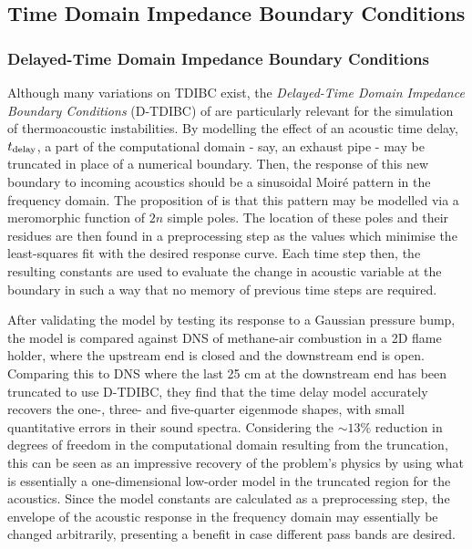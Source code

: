 \subsection{Time Domain Impedance Boundary Conditions}




\subsubsection{Delayed-Time Domain Impedance Boundary Conditions}

Although many variations on TDIBC exist, the \emph{Delayed-Time Domain Impedance Boundary Conditions} (D-TDIBC) of \cite{douasbin2018DelayedtimeDomainImpedance} are particularly relevant for the simulation of thermoacoustic instabilities. By modelling the effect of an acoustic time delay, $t_{\rm{delay}}$, a part of the computational domain - say, an exhaust pipe - may be truncated in place of a numerical boundary. Then, the response of this new boundary to incoming acoustics should be a sinusoidal Moiré pattern in the frequency domain. The proposition of \cite{douasbin2018DelayedtimeDomainImpedance} is that this pattern may be modelled via a meromorphic function of $2n$ simple poles. The location of these poles and their residues are then found in a preprocessing step as the values which minimise the least-squares fit with the desired response curve. Each time step then, the resulting constants are used to evaluate the change in acoustic variable at the boundary in such a way that no memory of previous time steps are required. 

After validating the model by testing its response to a Gaussian pressure bump, the model is compared against DNS of methane-air combustion in a 2D flame holder, where the upstream end is closed and the downstream end is open. Comparing this to DNS where the last 25 cm at the downstream end has been truncated to use D-TDIBC, they find that the time delay model accurately recovers the one-, three- and five-quarter eigenmode shapes, with small quantitative errors in their sound spectra. Considering the $\sim 13\%$ reduction in degrees of freedom in the computational domain resulting from the truncation, this can be seen as an impressive recovery of the problem's physics by using what is essentially a one-dimensional low-order model in the truncated region for the acoustics. Since the model constants are calculated as a preprocessing step, the envelope of the acoustic response in the frequency domain may essentially be changed arbitrarily, presenting a benefit in case different pass bands are desired.

